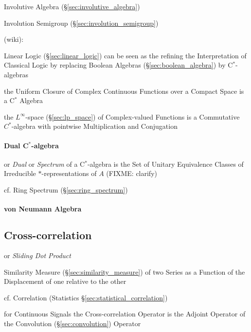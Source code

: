 Involutive Algebra (\S\ref{sec:involutive_algebra})

Involution Semigroup (\S\ref{sec:involution_semigroup})

(wiki):

Linear Logic (\S\ref{sec:linear_logic}) can be seen as the refining
the Interpretation of Classical Logic by replacing Boolean Algebras
(\S\ref{sec:boolean_algebra}) by C$^*$-algebras

the Uniform Closure of Complex Continuous Functions over a Compact Space is a
C$^*$ Algebra

the $L^\infty$-space (\S\ref{sec:lp_space}) of Complex-valued Functions is a
Commutative $C^*$-algebra with pointwise Multiplication and Conjugation



\paragraph{Dual C$^*$-algebra}\label{sec:cstar_dual}\hfill

or \emph{Dual} or \emph{Spectrum} of a C$^*$-algebra is the Set of Unitary
Equivalence Classes of Irreducible $*$-representations of $A$ (FIXME: clarify)

cf. Ring Spectrum (\S\ref{sec:ring_spectrum})



\paragraph{von Neumann Algebra}\label{sec:vonneumann_algebra}\hfill



\subsection{Cross-correlation}\label{sec:cross_correlation}

or \emph{Sliding Dot Product}

Similarity Measure (\S\ref{sec:similarity_measure}) of two Series as a Function
of the Displacement of one relative to the other

\fist cf. Correlation (Statistics \S\ref{sec:statistical_correlation})

for Continuous Signals the Cross-correlation Operator is the Adjoint Operator
of the Convolution (\S\ref{sec:convolution}) Operator


